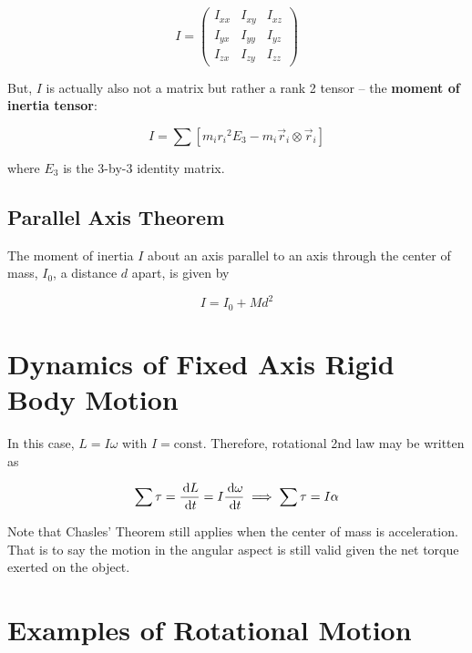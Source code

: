 \begin{equation}
	I = \begin{pmatrix}
		I_{xx} & I_{xy} & I_{xz}\\
		I_{yx} & I_{yy} & I_{yz}\\
		I_{zx} & I_{zy} & I_{zz}
	\end{pmatrix}
\end{equation}

But, $I$ is actually also not a matrix but rather a rank 2 tensor -- the \textbf{moment of inertia tensor}:

\begin{equation}
	I = \sum \left[m_i {r_i}^2 E_3 - m_i \vec r_i \otimes \vec r_i\right]
\end{equation}

where $E_3$ is the 3-by-3 identity matrix.

\subsection{Parallel Axis Theorem}

\begin{theorem}
	The moment of inertia $I$ about an axis parallel to an axis through the center of mass, $I_0$, a distance $d$ apart, is given by

	\begin{equation}
		I = I_0 + Md^2
	\end{equation}
\end{theorem}

\section{Dynamics of Fixed Axis Rigid Body Motion}

In this case, $L = I\omega$ with $I = \text{const}$. Therefore, rotational 2nd law may be written as

\begin{equation}
	\sum \tau = \frac{\D L}{\D t} = I \frac{\D \omega}{\D t} \implies \sum \tau = I \alpha
\end{equation}

\begin{remark}
	Note that Chasles' Theorem still applies when the center of mass is acceleration. That is to say the motion in the angular aspect is still valid given the net torque exerted on the object.
\end{remark}

\section{Examples of Rotational Motion}

